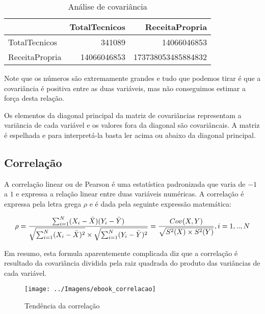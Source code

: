 \documentclass[11pt,]{style/krantz}
\renewenvironment{quote}{\begin{VF}}{\end{VF}}
\theoremstyle{definition}
\theoremstyle{definition}
\theoremstyle{definition}
\theoremstyle{remark}
\begin{document}
\begin{table}[!h]

\caption{\label{tab:unnamed-chunk-103}Análise de covariância}
\centering
\begin{tabular}{lrr}
\toprule
  & TotalTecnicos & ReceitaPropria\\
\midrule
TotalTecnicos & 341089 & 14066046853\\
ReceitaPropria & 14066046853 & 173738053485884832\\
\bottomrule
\end{tabular}
\end{table}

Note que os números são extremamente grandes e tudo que podemos tirar é que a covariância é positiva entre as duas variáveis, mas não conseguimos estimar a força desta relação.

\begin{quote}
Os elementos da diagonal principal da matriz de covariâncias representam a variãncia de cada variável e os valores fora da diagonal são covariâncais.
A matriz é espelhada e para interpretá-la basta ler acima ou abaixo da diagonal principal.
\end{quote}

\hypertarget{correlacao}{%
\subsection{Correlação}\label{correlacao}}

A correlação linear ou de Pearson é uma estatística padronizada que varia de \(-1\) a \(1\) e expressa a relação linear entre duas variáveis numéricas. A correlação é expressa pela letra grega \(\rho\) e é dada pela seguinte expressão matemática:

\[\rho = \frac {\sum_{i=1}^N(X_i-\bar X)(Y_i - \bar Y)}{\sqrt{\sum_{i=1}^N(X_i-\bar X)^2} \times \sqrt{\sum_{i=1}^N(Y_i-\bar Y)^2}}=\frac{Cov(X,Y)}{\sqrt{S^2(X) \times S^2(Y)}}, \\ i=1,..,N\]

Em resumo, esta formula aparentemente complicada diz que a correlação é resultado da covariância dividida pela raiz quadrada do produto das variâncias de cada variável.

\begin{figure}[H]

{\centering \texttt{[image: ../Imagens/ebook\_correlacao]}

}

\caption{Tendência da correlação}\label{fig:fig11}
\end{figure}
\end{document}
